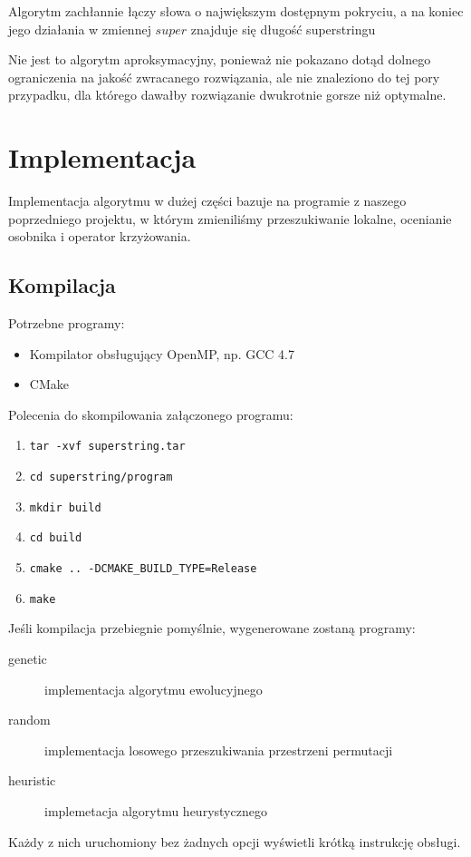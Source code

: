 \documentclass[11pt, a4wide]{mwart}
\begin{document}
Algorytm zachłannie łączy słowa o największym dostępnym pokryciu, a na koniec jego działania
w zmiennej $super$ znajduje się długość superstringu

Nie jest to algorytm aproksymacyjny, ponieważ nie pokazano dotąd dolnego ograniczenia na jakość
zwracanego rozwiązania, ale nie znaleziono do tej pory przypadku, dla którego dawałby rozwiązanie
dwukrotnie gorsze niż optymalne.





\section{Implementacja}
Implementacja algorytmu w dużej części bazuje na programie z naszego poprzedniego projektu, 
w którym zmieniliśmy przeszukiwanie lokalne, ocenianie osobnika i operator krzyżowania.

\subsection{Kompilacja}
Potrzebne programy:
\begin{itemize}
  \item Kompilator obsługujący OpenMP, np. GCC 4.7
  \item CMake
\end{itemize}
Polecenia do skompilowania załączonego programu:
\begin{enumerate}
  \item \verb|tar -xvf superstring.tar|
  \item \verb|cd superstring/program|
  \item \verb|mkdir build|
  \item \verb|cd build|
  \item \verb|cmake .. -DCMAKE_BUILD_TYPE=Release|
  \item \verb|make|
\end{enumerate}
Jeśli kompilacja przebiegnie pomyślnie, wygenerowane zostaną programy:
\begin{description}
  \item[genetic] implementacja algorytmu ewolucyjnego
  \item[random] implementacja losowego przeszukiwania przestrzeni permutacji
  \item[heuristic] implemetacja algorytmu heurystycznego
\end{description}
Każdy z nich uruchomiony bez żadnych opcji wyświetli krótką instrukcję obsługi.
\end{document}
